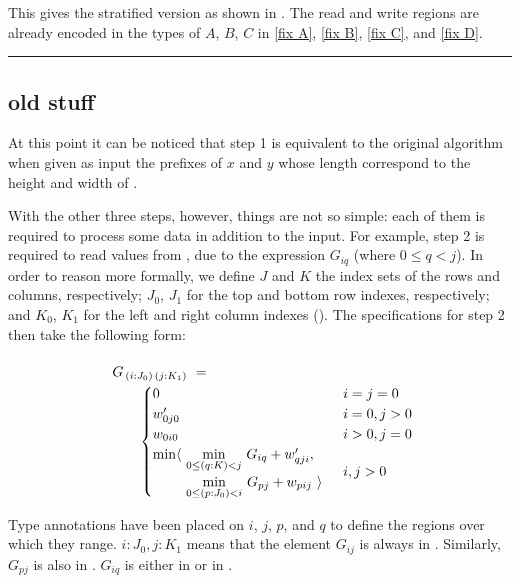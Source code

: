 This gives the stratified version as shown in .
The read and write regions are already encoded in the types of $A$, $B$, $C$ in 
\eqref{fix A}, \eqref{fix B}, \eqref{fix C}, and \eqref{fix D}.

\hrule
\bigskip


\subsection{old stuff}


At this point it can be noticed that step 1 is equivalent to the original
algorithm when given as input the prefixes of $x$ and $y$ whose length correspond to the
height and width of .

With the other three steps, however, things are not so simple:
each of them is required to process some data in addition to the input.
For example, step 2 is required to read values from , due to the expression
$G_{iq}$ (where $\scriptstyle 0\leq q<j$).
In order to reason more formally, we define $J$ and $K$ the index sets of the rows
and columns, respectively; $J_0$, $J_1$ for the top and bottom row indexes, respectively;
and $K_0$, $K_1$ for the left and right column indexes ().
The specifications for step 2 then take the following form:

\begin{equation}\LeftEqNo
\renewcommand\arraystretch{1.5}
\begin{array}{l@{}l}
	G_{\,(i : J_0)\,(j : K_1)} ~=~  \\
	\qquad
	\begin{cases}
		0                        & i=j=0 \\
		w'_{0j0}                 & i=0, j>0 \\
		w_{0i0}                  & i>0, j=0 \\
		\begin{array}{@{}l@{~}l}
		  \min\langle & \underset{0\leq (q:K) <j}\min ~ G_{iq} + w'_{qji}, \\
		              & \underset{0\leq (p:J_0) <i}\min ~ G_{pj} + w_{pij}~\rangle
		\end{array}              & i,j>0
	\end{cases}
\end{array}
\end{equation}

\medskip
Type annotations have been placed on $i$, $j$, $p$, and $q$ to define the regions
over which they range. $i:J_0, j:K_1$ means that the element $G_{ij}$
is always in . Similarly, $G_{pj}$ is also in . $G_{iq}$ is either in
 or in .



